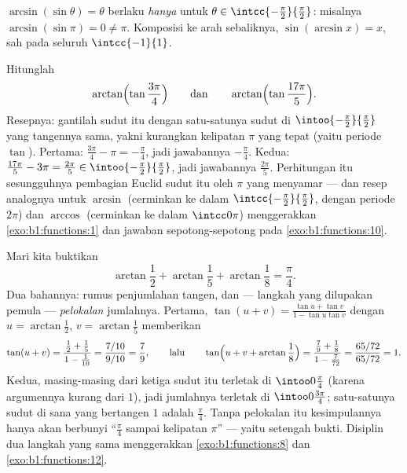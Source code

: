 \begin{remark}
$\arcsin(\sin\theta) = \theta$ berlaku \emph{hanya} untuk $\theta \in
\intcc{-\frac\pi2}{\frac\pi2}$: misalnya
$\arcsin(\sin\pi) = 0 \neq \pi$. Komposisi ke arah
sebaliknya, $\sin(\arcsin x) = x$, sah pada seluruh
$\intcc{-1}{1}$.
\end{remark}

\begin{example}
\label{ex:b1:functions:wrap}
Hitunglah
\[
\arctan\Bigl(\tan\frac{3\pi}4\Bigr)
\qquad\text{dan}\qquad
\arctan\Bigl(\tan\frac{17\pi}5\Bigr).
\]
Resepnya: gantilah sudut
itu dengan satu-satunya sudut di $\intoo{-\frac\pi2}{\frac\pi2}$ yang
tangennya sama, yakni kurangkan kelipatan $\pi$ yang tepat
(yaitu periode $\tan$). Pertama: $\frac{3\pi}4 - \pi =
-\frac\pi4$, jadi jawabannya $-\frac\pi4$. Kedua: $\frac{17\pi}
5 - 3\pi = \frac{2\pi}5 \in \intoo{-\frac\pi2}{\frac\pi2}$, jadi
jawabannya $\frac{2\pi}5$. Perhitungan itu sesungguhnya pembagian
Euclid sudut itu oleh $\pi$ yang menyamar --- dan resep analognya
untuk $\arcsin$ (cerminkan ke dalam
$\intcc{-\frac\pi2}{\frac\pi2}$, dengan periode $2\pi$) dan $\arccos$
(cerminkan ke dalam $\intcc0\pi$) menggerakkan \cref{exo:b1:functions:1} dan
jawaban sepotong-sepotong pada \cref{exo:b1:functions:10}.
\end{example}

\begin{example}\label{ex:b1:functions:arctansum}
Mari kita buktikan
\[
\arctan\frac12 + \arctan\frac15 + \arctan\frac18 = \frac\pi4 .
\]
Dua bahannya: rumus penjumlahan tangen, dan --- langkah yang
dilupakan pemula --- \emph{pelokalan} jumlahnya. Pertama,
$\tan(u + v) = \frac{\tan u + \tan v}{1 - \tan u\tan v}$ dengan
$u = \arctan\frac12$, $v = \arctan\frac15$ memberikan
\[
\tan(u + v) = \frac{\frac12 + \frac15}{1 - \frac1{10}}
= \frac{7/10}{9/10} = \frac79,
\qquad\text{lalu}\qquad
\tan\Bigl(u + v + \arctan\frac18\Bigr)
= \frac{\frac79 + \frac18}{1 - \frac7{72}}
= \frac{65/72}{65/72} = 1 .
\]
Kedua, masing-masing dari ketiga sudut itu terletak di $\intoo0{\frac\pi4}$
(karena argumennya kurang dari $1$), jadi jumlahnya terletak di
$\intoo0{\frac{3\pi}4}$; satu-satunya sudut di sana yang bertangen $1$ adalah
$\frac\pi4$. Tanpa pelokalan itu kesimpulannya hanya akan berbunyi
``$\frac\pi4$ sampai kelipatan $\pi$'' --- yaitu setengah bukti. Disiplin
dua langkah yang sama menggerakkan \cref{exo:b1:functions:8} dan
\cref{exo:b1:functions:12}.
\end{example}

